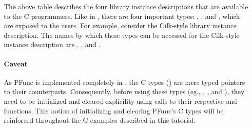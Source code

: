 The above table describes the four library instance descriptions that are
available to the C programmers.  Like in \Cpp{}, there are four important
types: , ,  and , which
are exposed to the users.  For example, consider the Cilk-style library
instance description.  The names by which these types can be accessed for the
Cilk-style instance description are ,
,  and
. 

\paragraph{Caveat} As PFunc is implemented completely in \Cpp{}, the C types
() are mere typed pointers to their
\Cpp{} counterparts. Consequently, before using these types (eg.,
, , 
and ), they need to be initialized and cleared
explicility using calls to their respective  and 
functions. This notion of initializing and clearing PFunc's C types will be
reinforced throughout the C examples described in this tutorial.
